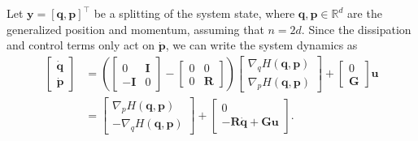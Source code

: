 \documentclass[11pt, a4paper]{article}
\theoremstyle{plain}
\theoremstyle{definition}
\theoremstyle{remark}
\begin{document}
Let $\mathbf{y} = [\mathbf{q},\mathbf{p}]^{\top}$ be a splitting of the system state, where $\mathbf{q},\mathbf{p} \in \mathbb R^d$ are the generalized position and momentum, assuming that $n = 2d$. Since the dissipation and control terms only act on $\dot{\mathbf{p}}$, we can write the system dynamics as
\begin{align*}
    \begin{bmatrix}
        \dot{\mathbf{q}} \\
        \dot{\mathbf{p}}
        \end{bmatrix}
        &= \left( \begin{bmatrix}
    0 & \mathbf{I}\\
    -\mathbf{I} & 0
    \end{bmatrix}
    - \begin{bmatrix}
    0 & 0\\
    0 & \mathbf{R}
    \end{bmatrix} \right) 
    \begin{bmatrix}
    \nabla_q H(\mathbf{q},\mathbf{p}) \\
    \nabla_p H(\mathbf{q},\mathbf{p})
    \end{bmatrix} 
    + 
    \begin{bmatrix}
    0 \\
    \mathbf{G} 
    \end{bmatrix} \mathbf{u}\\
    &= \begin{bmatrix}
        \nabla_p H(\mathbf{q},\mathbf{p}) \\
        -\nabla_q H(\mathbf{q},\mathbf{p})
    \end{bmatrix}+
    \begin{bmatrix}
        0 \\
        - \mathbf{R}\dot{\mathbf{q}} + \mathbf{G} \mathbf{u}
    \end{bmatrix}.
    \end{align*}
\end{document}
